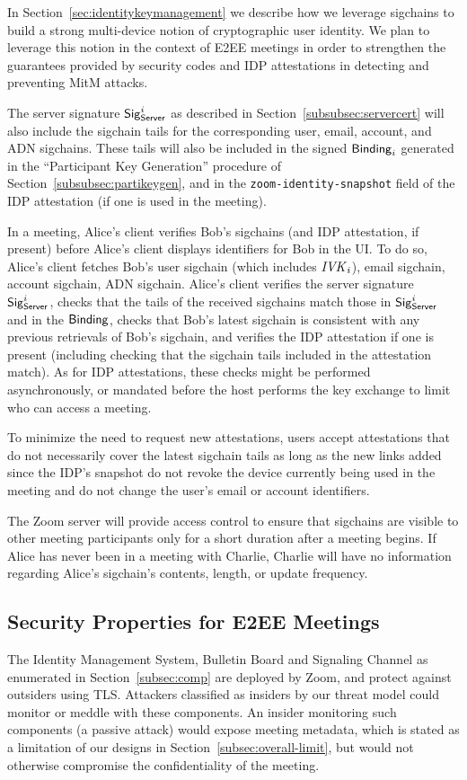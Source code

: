 In Section~\ref{sec:identitykeymanagement} we describe how we leverage sigchains to build a strong
multi-device notion of cryptographic user identity. We plan to leverage this notion in the context
of E2EE meetings in order to strengthen the guarantees provided by security codes and IDP
attestations in detecting and preventing MitM attacks.

The server signature ${\sf Sig}^i_{\mathsf{Server}}$ as described in Section~\ref{subsubsec:servercert} will also include the
sigchain tails for the corresponding user, email, account, and ADN sigchains. These tails will also
be included in the signed ${\sf Binding}_i$ generated in the ``Participant Key Generation'' procedure of
Section~\ref{subsubsec:partikeygen}, and in the \texttt{zoom-identity-snapshot} field of the IDP
attestation (if one is used in the meeting). 

In a meeting, Alice's client verifies Bob's sigchains (and IDP attestation, if present) before
Alice's client displays identifiers for Bob in the UI. To do so, Alice's client fetches Bob's user
sigchain (which includes $\mathit{IVK}_i$), email sigchain, account sigchain, ADN sigchain. Alice's client
verifies the server signature ${\sf Sig}^i_{\mathsf{Server}}$, checks that the tails
of the received sigchains match those in ${\sf Sig}^i_{\mathsf{Server}}$ and in the
${\sf Binding}$, checks that Bob's latest sigchain is consistent with any previous
retrievals of Bob's sigchain, and verifies the IDP attestation if one is present
(including checking that the sigchain tails included in the attestation match).
As for IDP attestations, these checks might be performed asynchronously, or
mandated before the host performs the key exchange to limit who can access a
meeting.

To minimize the need to request new attestations, users accept attestations that
do not necessarily cover the latest sigchain tails as long as the new links
added since the IDP's snapshot do not revoke the device currently being used in
the meeting and do not change the user's email or account identifiers.

The Zoom server will provide access control to ensure that sigchains are visible to other meeting
participants only for a short duration after a meeting begins. If Alice has never been in a meeting
with Charlie, Charlie will have no information regarding Alice's sigchain's contents, length, or
update frequency.

\subsection{Security Properties for E2EE Meetings}
\label{subsec:secprop}
The Identity Management System, Bulletin Board and Signaling Channel as enumerated in
Section~\ref{subsec:comp} are deployed by Zoom, and protect against outsiders using TLS. Attackers
classified as insiders by our threat model could monitor or meddle with these components. An insider
monitoring such components (a passive attack) would expose meeting metadata, which is stated as a
limitation of our designs in Section~\ref{subsec:overall-limit}, but would not otherwise compromise
the confidentiality of the meeting.

